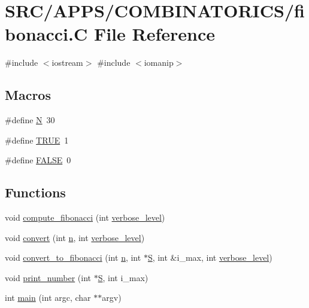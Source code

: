 \hypertarget{fibonacci_8_c}{}\section{S\+R\+C/\+A\+P\+P\+S/\+C\+O\+M\+B\+I\+N\+A\+T\+O\+R\+I\+C\+S/fibonacci.C File Reference}
\label{fibonacci_8_c}
{\ttfamily \#include $<$iostream$>$}\newline
{\ttfamily \#include $<$iomanip$>$}\newline
\subsection*{Macros}
\begin{DoxyCompactItemize}
\item 
\#define \mbox{\hyperlink{fibonacci_8_c_a0240ac851181b84ac374872dc5434ee4}{N}}~30
\item 
\#define \mbox{\hyperlink{fibonacci_8_c_aa8cecfc5c5c054d2875c03e77b7be15d}{T\+R\+UE}}~1
\item 
\#define \mbox{\hyperlink{fibonacci_8_c_aa93f0eb578d23995850d61f7d61c55c1}{F\+A\+L\+SE}}~0
\end{DoxyCompactItemize}
\subsection*{Functions}
\begin{DoxyCompactItemize}
\item 
void \mbox{\hyperlink{fibonacci_8_c_aad0ab3e729df30b98f713a5d5c85d590}{compute\+\_\+fibonacci}} (int \mbox{\hyperlink{simeon_8_c_a818073fbcc2f439e7c56952f67386122}{verbose\+\_\+level}})
\item 
void \mbox{\hyperlink{fibonacci_8_c_a0fa464c2e7d41805ac6377c75f6bbce6}{convert}} (int \mbox{\hyperlink{simeon_8_c_a7f2cd26777ce0ff3fdaf8d02aacbddfb}{n}}, int \mbox{\hyperlink{simeon_8_c_a818073fbcc2f439e7c56952f67386122}{verbose\+\_\+level}})
\item 
void \mbox{\hyperlink{fibonacci_8_c_a660cfb2b0a23ae5a1ec0bbe7d246eb51}{convert\+\_\+to\+\_\+fibonacci}} (int \mbox{\hyperlink{simeon_8_c_a7f2cd26777ce0ff3fdaf8d02aacbddfb}{n}}, int $\ast$\mbox{\hyperlink{simeon_8_c_adab47f8243f1b5a2c31df2535d6b37d0}{S}}, int \&i\+\_\+max, int \mbox{\hyperlink{simeon_8_c_a818073fbcc2f439e7c56952f67386122}{verbose\+\_\+level}})
\item 
void \mbox{\hyperlink{fibonacci_8_c_ae71ac5a6ea382e5a64756750b12e8950}{print\+\_\+number}} (int $\ast$\mbox{\hyperlink{simeon_8_c_adab47f8243f1b5a2c31df2535d6b37d0}{S}}, int i\+\_\+max)
\item 
int \mbox{\hyperlink{fibonacci_8_c_a3c04138a5bfe5d72780bb7e82a18e627}{main}} (int argc, char $\ast$$\ast$argv)
\end{DoxyCompactItemize}
